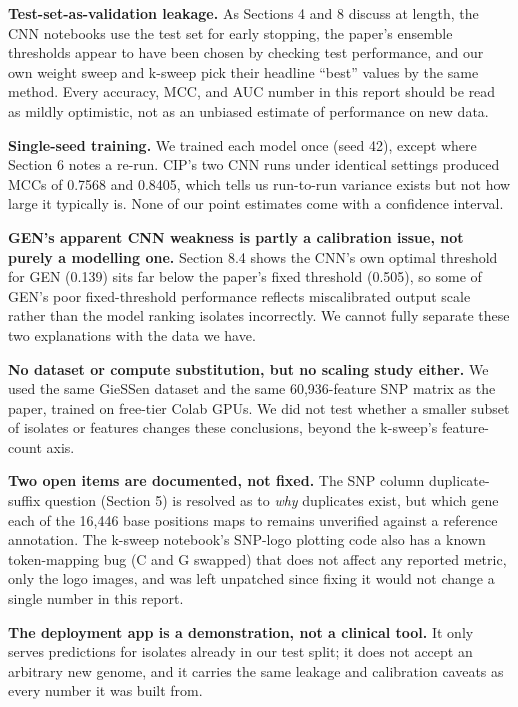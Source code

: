 \documentclass[11pt]{article}
\begin{document}
\textbf{Test-set-as-validation leakage.} As Sections 4 and 8 discuss at length, the CNN notebooks use the test set for early stopping, the paper's ensemble thresholds appear to have been chosen by checking test performance, and our own weight sweep and k-sweep pick their headline ``best'' values by the same method. Every accuracy, MCC, and AUC number in this report should be read as mildly optimistic, not as an unbiased estimate of performance on new data.

\textbf{Single-seed training.} We trained each model once (seed 42), except where Section 6 notes a re-run. CIP's two CNN runs under identical settings produced MCCs of 0.7568 and 0.8405, which tells us run-to-run variance exists but not how large it typically is. None of our point estimates come with a confidence interval.

\textbf{GEN's apparent CNN weakness is partly a calibration issue, not purely a modelling one.} Section 8.4 shows the CNN's own optimal threshold for GEN (0.139) sits far below the paper's fixed threshold (0.505), so some of GEN's poor fixed-threshold performance reflects miscalibrated output scale rather than the model ranking isolates incorrectly. We cannot fully separate these two explanations with the data we have.

\textbf{No dataset or compute substitution, but no scaling study either.} We used the same GieSSen dataset and the same 60,936-feature SNP matrix as the paper, trained on free-tier Colab GPUs. We did not test whether a smaller subset of isolates or features changes these conclusions, beyond the k-sweep's feature-count axis.

\textbf{Two open items are documented, not fixed.} The SNP column duplicate-suffix question (Section 5) is resolved as to \emph{why} duplicates exist, but which gene each of the 16,446 base positions maps to remains unverified against a reference annotation. The k-sweep notebook's SNP-logo plotting code also has a known token-mapping bug (C and G swapped) that does not affect any reported metric, only the logo images, and was left unpatched since fixing it would not change a single number in this report.

\textbf{The deployment app is a demonstration, not a clinical tool.} It only serves predictions for isolates already in our test split; it does not accept an arbitrary new genome, and it carries the same leakage and calibration caveats as every number it was built from.

\end{document}

